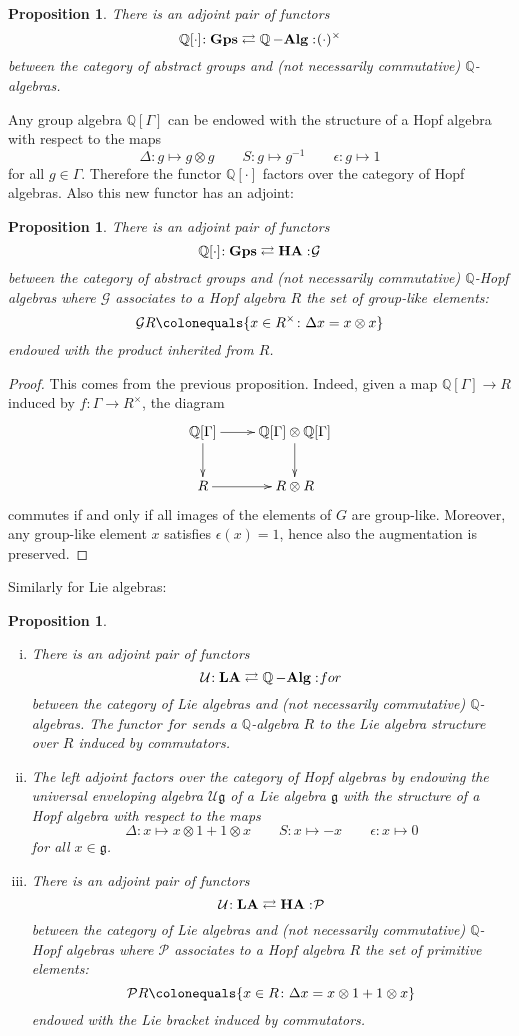 \documentclass{amsart}
\newtheorem{prop}[thm]{Proposition}
\theoremstyle{definition}
\theoremstyle{remark}
\theoremstyle{remark}
\newcommand{\Q}{\mathbb{Q}}
\newcommand{\ra}{\rightarrow}
\newcommand{\mcG}{\mathcal{G}}
\newcommand{\mcP}{\mathcal{P}}
\newcommand{\mcU}{\mathcal{U}}
\newcommand{\mfg}{\mathfrak{g}}
\newcommand{\adj}[4]{#1\negmedspace: #2\rightleftarrows #3:\negmedspace #4}
\DeclareMathOperator{\Alg}{\bf{-Alg}}
\DeclareMathOperator{\Gps}{\bf{Gps}}
\DeclareMathOperator{\HA}{\bf{HA}}
\DeclareMathOperator{\LA}{\bf{LA}}
\begin{document}
\begin{prop}
There is an adjoint pair of functors
\[
\adj{\Q[\cdot]}{\Gps}{\Q\Alg}{(\cdot)^\times}
\]
between the category of abstract groups and (not necessarily commutative) $\Q$-algebras.
\end{prop}

Any group algebra $\Q[\Gamma]$ can be endowed with the structure of a Hopf algebra with respect to the maps
\[
\Delta\colon g\mapsto g\otimes g\qquad
S\colon g\mapsto g^{-1}\qquad
\epsilon\colon g\mapsto1
\]
for all $g\in\Gamma$. Therefore the functor $\Q[\cdot]$ factors over the category of Hopf algebras. Also this new functor has an adjoint:
\begin{prop}
There is an adjoint pair of functors
\[
\adj{\Q[\cdot]}{\Gps}{\HA}{\mcG}
\]
between the category of abstract groups and (not necessarily commutative) $\Q$-Hopf algebras where $\mcG$ associates to a Hopf algebra $R$ the set of group-like elements:
\[
\mcG R\colonequals\{x\in R^\times\colon \Delta x=x\otimes x\}
\]
endowed with the product inherited from $R$.
\end{prop}

\begin{proof}
This comes from the previous proposition. Indeed, given a map $\Q[\Gamma]\ra R$ induced by $f\colon\Gamma\ra R^\times$, the diagram 
$$\xymatrix{
\Q[\Gamma]\ar[r]\ar[d]&\Q[\Gamma]\otimes\Q[\Gamma]\ar[d]\\
R\ar[r]&R\otimes R
}$$
commutes if and only if all images of the elements of $G$ are group-like. Moreover, any group-like element $x$ satisfies $\epsilon(x)=1$, hence also the augmentation is preserved.
\end{proof}

Similarly for Lie algebras:
\begin{prop}\begin{enumerate}[(i)]
\item There is an adjoint pair of functors
\[
\adj{\mcU}{\LA}{\Q\Alg}{for}
\]
between the category of Lie algebras and (not necessarily commutative) $\Q$-algebras. The functor $for$ sends a $\Q$-algebra $R$ to the Lie algebra structure over $R$ induced by commutators.
\item The left adjoint factors over the category of Hopf algebras by endowing the universal enveloping algebra $\mcU\mfg$ of a Lie algebra $\mfg$ with the structure of a Hopf algebra with respect to the maps
\[
\Delta\colon x\mapsto x\otimes1+1\otimes x\qquad
S\colon x\mapsto -x\qquad
\epsilon\colon x\mapsto0
\]
for all $x\in\mfg$.
\item There is an adjoint pair of functors
\[
\adj{\mcU}{\LA}{\HA}{\mcP}
\]
between the category of Lie algebras and (not necessarily commutative) $\Q$-Hopf algebras where $\mcP$ associates to a Hopf algebra $R$ the set of primitive elements:
\[
\mcP R\colonequals\{x\in R\colon \Delta x=x\otimes 1+1\otimes x\}
\]
endowed with the Lie bracket induced by commutators.
\end{enumerate}
\end{prop}
\end{document}
